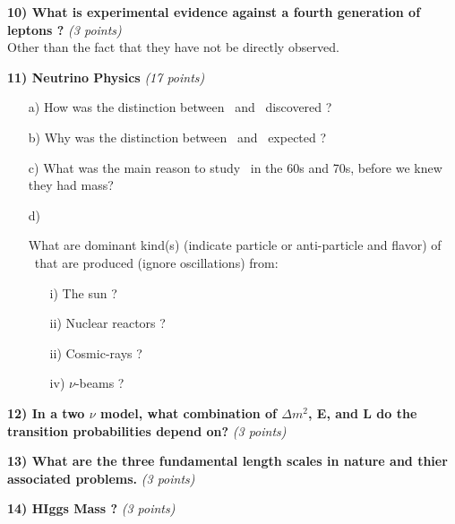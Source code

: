 {\textbf{10) What is experimental evidence against a fourth generation of leptons ? } \hfill \textit{(3 points)}\\
Other than the fact that they have not be directly observed.
\vspace{0.5in}

\textbf{11) Neutrino Physics } \hfill \textit{(17 points)}\\
\begin{itemize}
\item[a)]{How was the distinction between \numu\ and \nue\ discovered ?
\vspace*{0.5in}
}

\item[b)]{Why was the distinction between \numu\ and \nue\  expected ?
\vspace*{0.5in}
}
\item[c)]{What was the main reason to study \nus\ in the 60s and 70s, before we knew they had mass?
\vspace*{0.5in}
}
\item[d)]{What are dominant kind(s) (indicate particle or anti-particle and flavor) of \nus\ that are produced (ignore oscillations) from:
\begin{itemize}
\item[i)]{ The sun ? 
\vspace*{0.25in}
} 
\item[ii)]{Nuclear reactors ? 
\vspace*{0.25in}
}
\item[ii)]{Cosmic-rays ? 
\vspace*{0.25in}
}
\item[iv)]{$\nu$-beams ?
\vspace*{0.25in}
}
\end{itemize}
}
\end{itemize}


\textbf{12) In a two $\nu$ model, what combination of $\Delta m^2$, E, and L do the transition probabilities depend on?  } \hfill \textit{(3 points)}\\
\vspace*{0.5in}

\textbf{13) What are the three fundamental length scales in nature and thier associated problems.  } \hfill \textit{(3 points)}\\
\vspace{0.5in}

\textbf{14) HIggs Mass ?  } \hfill \textit{(3 points)}\\
\vspace{0.5in}

} %

